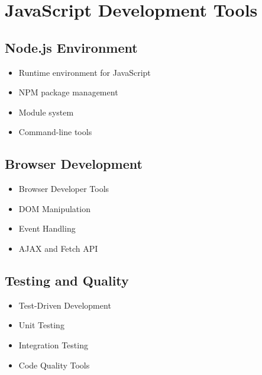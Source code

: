 \section{JavaScript Development Tools}

\subsection{Node.js Environment}
\begin{itemize}
    \item Runtime environment for JavaScript
    \item NPM package management
    \item Module system
    \item Command-line tools
\end{itemize}

\subsection{Browser Development}
\begin{itemize}
    \item Browser Developer Tools
    \item DOM Manipulation
    \item Event Handling
    \item AJAX and Fetch API
\end{itemize}

\subsection{Testing and Quality}
\begin{itemize}
    \item Test-Driven Development
    \item Unit Testing
    \item Integration Testing
    \item Code Quality Tools
\end{itemize}